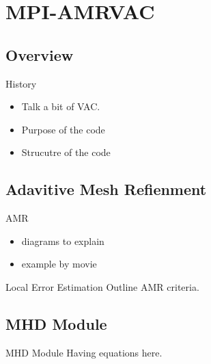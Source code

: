 \documentclass{beamer}
\begin{document}
\section{MPI-AMRVAC}
\subsection{Overview}
\begin{frame}
\begin{block}{History}
\begin{itemize}
\item Talk a bit of VAC.
\item Purpose of the code
\item Strucutre of the code
\end{itemize}
\end{block}
\end{frame}
\subsection{Adavitive Mesh Refienment}
\begin{frame}
\begin{block}{AMR}
\begin{itemize}
\item diagrams to explain
\item example by movie
\end{itemize}
\end{block}
\end{frame}
\begin{frame}
\begin{block}{Local Error Estimation}
Outline AMR criteria.
\end{block}
\end{frame}
\subsection{MHD Module}
\begin{frame}

\begin{block}{MHD Module}
Having equations here.
\end{block}
\end{frame}



\end{document}
